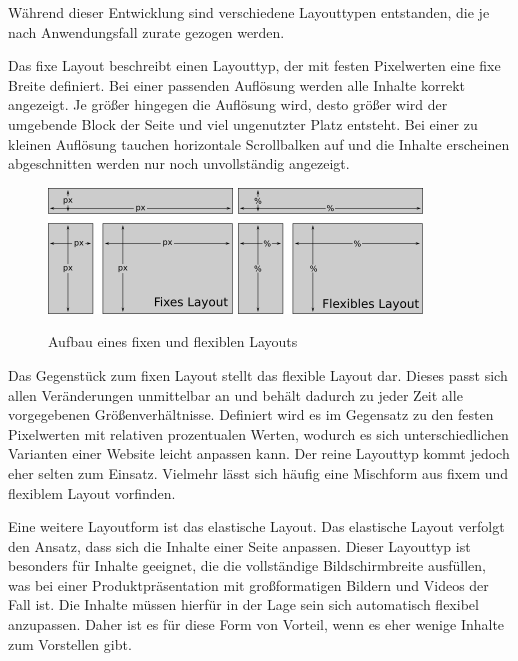 Während dieser Entwicklung sind verschiedene Layouttypen entstanden, die je nach Anwendungsfall zurate gezogen werden.

Das fixe Layout beschreibt einen Layouttyp, der mit festen Pixelwerten eine fixe Breite definiert. Bei einer passenden Auflösung werden alle Inhalte korrekt angezeigt. Je größer hingegen die Auflösung wird, desto größer wird der umgebende Block der Seite und viel ungenutzter Platz entsteht. Bei einer zu kleinen Auflösung tauchen horizontale Scrollbalken auf und die Inhalte erscheinen abgeschnitten \bzw werden nur noch unvollständig angezeigt.

\begin{figure}
    \centering
    \includegraphics[scale=1.2]{figures/jan/Wire_Fixes-Layout.png}
    \hspace{0.05\textwidth}
    \includegraphics[scale=1.2]{figures/jan/Wire_Flexibles-Layout.png}
    \caption[Aufbau eines fixen und flexiblen Layouts]{Aufbau eines fixen und flexiblen Layouts}
    \label{fig:image}
\end{figure}

Das Gegenstück zum fixen Layout stellt das flexible Layout dar. Dieses passt sich allen Veränderungen unmittelbar an und behält dadurch zu jeder Zeit alle vorgegebenen Größenverhältnisse. Definiert wird es im Gegensatz zu den festen Pixelwerten mit relativen prozentualen Werten, wodurch es sich unterschiedlichen Varianten einer Website leicht anpassen kann. Der reine Layouttyp kommt jedoch eher selten zum Einsatz. Vielmehr lässt sich häufig eine Mischform aus fixem und flexiblem Layout vorfinden.

Eine weitere Layoutform ist das elastische Layout. Das elastische Layout verfolgt den Ansatz, dass sich die Inhalte einer Seite anpassen. Dieser Layouttyp ist besonders für Inhalte geeignet, die die vollständige Bildschirmbreite ausfüllen, was \bspw bei einer Produktpräsentation mit großformatigen Bildern und Videos der Fall ist. Die Inhalte müssen hierfür in der Lage sein sich automatisch flexibel anzupassen. Daher ist es für diese Form von Vorteil, wenn es eher wenige Inhalte zum Vorstellen gibt.

